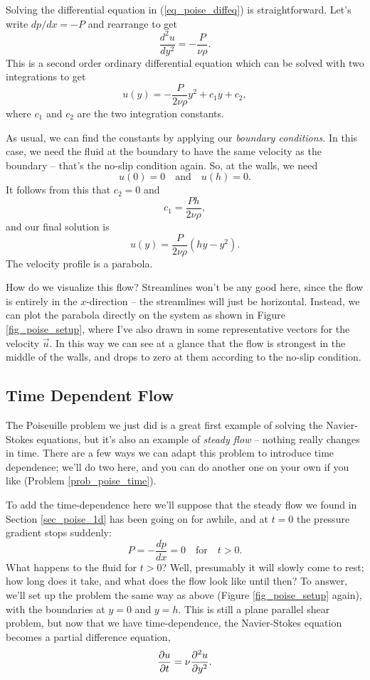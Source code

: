 Solving the differential equation in (\ref{eq_poise_diffeq}) is straightforward.  Let's write $dp/dx = -P$ and rearrange to get
\[
\frac{d^2u}{dy^2} = -\frac{P}{\nu \rho}.
\]
This is a second order ordinary differential equation which can be solved with two integrations to get
\[
u(y) = -\frac{P}{2\nu \rho} y^2 + c_1 y + c_2,
\]
where $c_1$ and $c_2$ are the two integration constants.

As usual, we can find the constants by applying our \emph{boundary conditions}.  In this case, we need the fluid at the boundary to have the same velocity as the boundary -- that's the no-slip condition again.  So, at the walls, we need
\[
u(0) = 0 \quad \text{and} \quad u(h) = 0.
\]
It follows from this that $c_2 = 0$ and
\[
c_1 = \frac{Ph}{2\nu \rho},
\]
and our final solution is
\begin{equation}
\label{eq_poise_steady}
u(y) = \frac{P}{2\nu \rho} (hy - y^2).
\end{equation}
The velocity profile is a parabola. 

How do we visualize this flow? Streamlines won't be any good here, since the flow is entirely in the $x$-direction -- the streamlines will just be horizontal.  Instead, we can plot the parabola directly on the system as shown in  Figure \ref{fig_poise_setup}, where I've also drawn in some representative vectors for the velocity $\vec{u}$.  In this way we can see at a glance that the flow is strongest in the middle of the walls, and drops to zero at them according to the no-slip condition.




\subsection{Time Dependent Flow}
\label{sec_poise_time}

The Poiseuille problem we just did is a great first example of solving the Navier-Stokes equations, but it's also an example of \emph{steady flow} -- nothing really changes in time. There are a few ways we can adapt this problem to introduce time dependence; we'll do two here, and you can do another one on your own if you like (Problem \ref{prob_poise_time}).

To add the time-dependence here we'll suppose that the steady flow we found in Section \ref{sec_poise_1d} has been going on for awhile, and at $t=0$ the pressure gradient stops suddenly:
\[
P = - \frac{dp}{dx} = 0 \quad \text{for} \quad t>0.
\]
What happens to the fluid for $t>0$?  Well, presumably it will slowly come to rest; how long does it take, and what does the flow look like until then?  To answer, we'll set up the problem the same way as above (Figure \ref{fig_poise_setup} again), with the boundaries at $y=0$ and $y=h$.  This is still a plane parallel shear problem, but now that we have time-dependence, the Navier-Stokes equation becomes a partial difference equation,
\begin{equation}
\label{eq_poise_pde}
\frac{\partial {u}}{\partial {t}} = \nu \frac{\partial^2 {u}}{\partial {y}^2}.
\end{equation}

